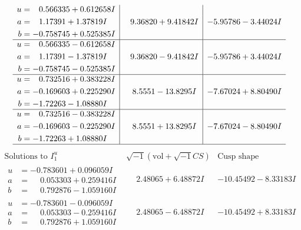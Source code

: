 \documentclass[1p]{elsarticle_modified}
\theoremstyle{definition}
\newcommand{\I}{\sqrt{-1}}
\begin{document}
$$\begin{array}{c|c|c}
\begin{aligned}
u &= \phantom{-}0.566335 + 0.612658 I \\
a &= \phantom{-}1.17391 + 1.37819 I \\
b &= -0.758745 + 0.525385 I\end{aligned}
 & \phantom{-}9.36820 + 9.41842 I & -5.95786 - 3.44024 I \\ \hline\begin{aligned}
u &= \phantom{-}0.566335 - 0.612658 I \\
a &= \phantom{-}1.17391 - 1.37819 I \\
b &= -0.758745 - 0.525385 I\end{aligned}
 & \phantom{-}9.36820 - 9.41842 I & -5.95786 + 3.44024 I \\ \hline\begin{aligned}
u &= \phantom{-}0.732516 + 0.383228 I \\
a &= -0.169603 + 0.225290 I \\
b &= -1.72263 - 1.08880 I\end{aligned}
 & \phantom{-}8.5551 - 13.8295 I & -7.67024 + 8.80490 I \\ \hline\begin{aligned}
u &= \phantom{-}0.732516 - 0.383228 I \\
a &= -0.169603 - 0.225290 I \\
b &= -1.72263 + 1.08880 I\end{aligned}
 & \phantom{-}8.5551 + 13.8295 I & -7.67024 - 8.80490 I\\
 \hline 
 \end{array}$$\newpage$$\begin{array}{c|c|c}  
\text{Solutions to }I^u_{1}& \I (\text{vol} + \sqrt{-1}CS) & \text{Cusp shape}\\
 \hline 
\begin{aligned}
u &= -0.783601 + 0.096059 I \\
a &= \phantom{-}0.053303 + 0.259416 I \\
b &= \phantom{-}0.792876 - 1.059160 I\end{aligned}
 & \phantom{-}2.48065 + 6.48872 I & -10.45492 - 8.33183 I \\ \hline\begin{aligned}
u &= -0.783601 - 0.096059 I \\
a &= \phantom{-}0.053303 - 0.259416 I \\
b &= \phantom{-}0.792876 + 1.059160 I\end{aligned}
 & \phantom{-}2.48065 - 6.48872 I & -10.45492 + 8.33183 I \\ \hline\begin{aligned}

\end{aligned}
\end{array}$$
\end{document}

